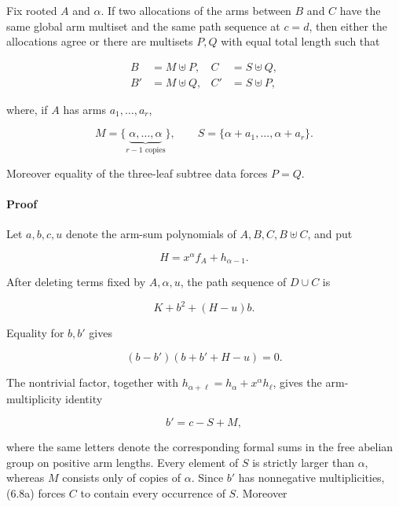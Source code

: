\documentclass[11pt]{article}
\begin{document}
Fix rooted $A$ and $\alpha$. If two allocations of the arms between $B$ and $C$ have the same
global arm multiset and the same path sequence at $c=d$, then either the allocations agree or there
are multisets $P,Q$ with equal total length such that

\begin{equation*}
\begin{aligned}
B&=M\mathbin{\uplus}P,&C&=S\mathbin{\uplus}Q,\\
B'&=M\mathbin{\uplus}Q,&C'&=S\mathbin{\uplus}P,
\end{aligned}
\tag{6.5}
\end{equation*}


where, if $A$ has arms $a_1,\ldots,a_r$,

\begin{equation*}
M=\{\underbrace{\alpha,\ldots,\alpha}_{r-1\text{ copies}}\},\qquad
S=\{\alpha+a_1,\ldots,\alpha+a_r\}.
\end{equation*}


Moreover equality of the three-leaf subtree data forces $P=Q$.

\paragraph{Proof}


Let $a,b,c,u$ denote the arm-sum polynomials of $A,B,C,B\uplus C$, and put

\begin{equation*}
H=x^\alpha f_A+h_{\alpha-1}.
\end{equation*}


After deleting terms fixed by $A,\alpha,u$, the path sequence of $D\cup C$ is

\begin{equation*}
K+b^2+(H-u)b.
\tag{6.6}
\end{equation*}


Equality for $b,b'$ gives

\begin{equation*}
(b-b')(b+b'+H-u)=0.
\tag{6.7}
\end{equation*}


The nontrivial factor, together with
$h_{\alpha+\ell}=h_\alpha+x^\alpha h_\ell$, gives the arm-multiplicity identity

\begin{equation*}
b'=c-S+M,
\tag{6.8a}
\end{equation*}


where the same letters denote the corresponding formal sums in the free abelian group on positive
arm lengths. Every element of $S$ is strictly larger than $\alpha$, whereas $M$ consists only of copies
of $\alpha$. Since $b'$ has nonnegative multiplicities, (6.8a) forces $C$ to contain every
occurrence of $S$. Moreover
\end{document}
